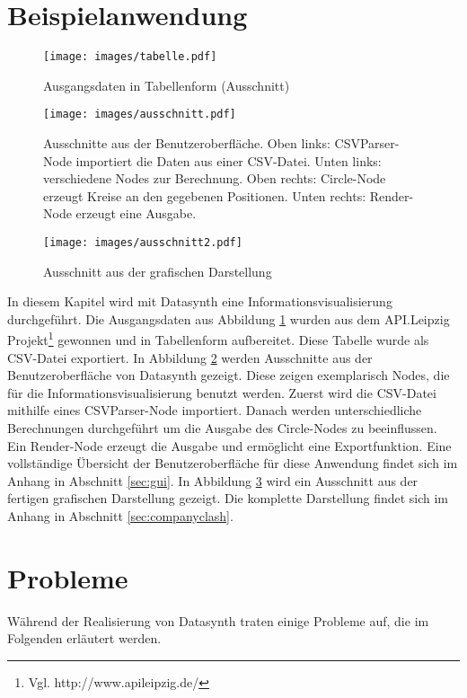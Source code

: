 \documentclass[a4paper, 
               12pt,
               DIV=calc,
               version=first,
               pdftex,
               headsepline,
               footsepline,
               bibtotocnumbered,
               liststotocnumbered]{scrreprt}
\begin{document}
\section{Beispielanwendung}
\label{sec:Beispielanwendung}
\begin{figure}
\centering
\texttt{[image: images/tabelle.pdf]}
\caption{Ausgangsdaten in Tabellenform (Ausschnitt)}
\label{fig:apitabelle}
\end{figure}
\begin{figure}
\centering
\texttt{[image: images/ausschnitt.pdf]}
\caption{Ausschnitte aus der Benutzeroberfläche.
Oben links: CSVParser-Node importiert die Daten aus einer CSV-Datei.
Unten links: verschiedene Nodes zur Berechnung.
Oben rechts: Circle-Node erzeugt Kreise an den gegebenen Positionen.
Unten rechts: Render-Node erzeugt eine Ausgabe.}
\label{fig:guiausschnitt}
\end{figure}
\begin{figure}
\centering
\texttt{[image: images/ausschnitt2.pdf]}
\caption{Ausschnitt aus der grafischen Darstellung}
\label{fig:companyausschnitt}
\end{figure}
In diesem Kapitel wird mit Datasynth eine Informationsvisualisierung durchgeführt.
Die Ausgangsdaten aus Abbildung \ref{fig:apitabelle} wurden aus dem API.Leipzig Projekt\footnote{Vgl.
http://www.apileipzig.de/} gewonnen und in Tabellenform aufbereitet. Diese Tabelle wurde
als CSV-Datei exportiert.
In Abbildung \ref{fig:guiausschnitt} werden Ausschnitte aus der Benutzeroberfläche von
Datasynth gezeigt. Diese zeigen exemplarisch Nodes, die für die Informationsvisualisierung
benutzt werden. Zuerst wird die CSV-Datei mithilfe eines CSVParser-Node importiert. Danach
werden unterschiedliche Berechnungen durchgeführt um die Ausgabe des Circle-Nodes zu beeinflussen.
Ein Render-Node erzeugt die Ausgabe und ermöglicht eine Exportfunktion.
Eine vollständige Übersicht der Benutzeroberfläche für diese Anwendung findet sich im Anhang
in Abschnitt \ref{sec:gui}.
In Abbildung \ref{fig:companyausschnitt} wird ein Ausschnitt aus der fertigen grafischen
Darstellung gezeigt. Die komplette Darstellung findet sich im Anhang in Abschnitt \ref{sec:companyclash}.

\section{Probleme}
\label{sec:Probleme}
Während der Realisierung von Datasynth traten einige Probleme auf, die im Folgenden
erläutert werden.
\end{document}
